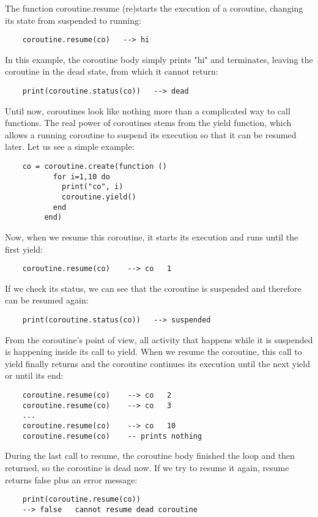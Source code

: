 \begin{itemize}
The function coroutine.resume (re)starts the execution of a coroutine, changing its state from suspended to running:
\begin{lstlisting}
    coroutine.resume(co)   --> hi
\end{lstlisting}

In this example, the coroutine body simply prints "hi" and terminates, leaving the coroutine in the dead state, from which it cannot return:
\begin{lstlisting}
    print(coroutine.status(co))   --> dead
\end{lstlisting}

Until now, coroutines look like nothing more than a complicated way to call functions. The real power of coroutines stems from the yield function, which allows a running coroutine to suspend its execution so that it can be resumed later. Let us see a simple example:
\begin{lstlisting}
    co = coroutine.create(function ()
           for i=1,10 do
             print("co", i)
             coroutine.yield()
           end
         end)
\end{lstlisting}

Now, when we resume this coroutine, it starts its execution and runs until the first yield:
\begin{lstlisting}
    coroutine.resume(co)    --> co   1
\end{lstlisting}

If we check its status, we can see that the coroutine is suspended and therefore can be resumed again:
\begin{lstlisting}
    print(coroutine.status(co))   --> suspended
\end{lstlisting}

From the coroutine's point of view, all activity that happens while it is suspended is happening inside its call to yield. When we resume the coroutine, this call to yield finally returns and the coroutine continues its execution until the next yield or until its end:
\begin{lstlisting}
    coroutine.resume(co)    --> co   2
    coroutine.resume(co)    --> co   3
    ...
    coroutine.resume(co)    --> co   10
    coroutine.resume(co)    -- prints nothing
\end{lstlisting}

During the last call to resume, the coroutine body finished the loop and then returned, so the coroutine is dead now. If we try to resume it again, resume returns false plus an error message:
\begin{lstlisting}
    print(coroutine.resume(co))
    --> false   cannot resume dead coroutine
\end{lstlisting}


\end{itemize}
